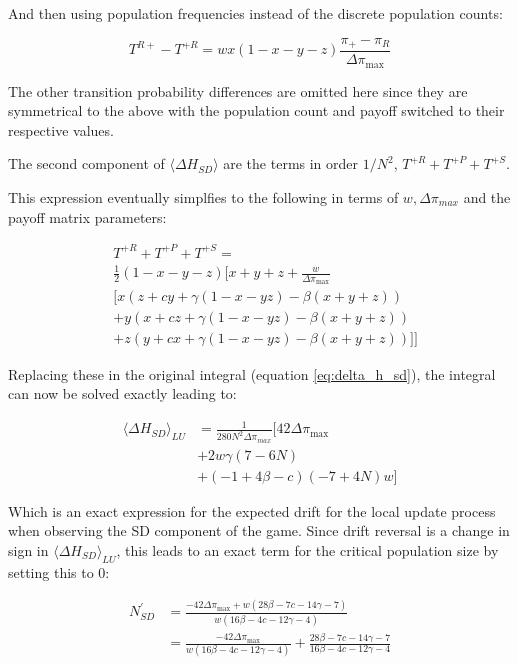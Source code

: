 \documentclass[%
 reprint,
 amsmath,amssymb,
 aps,
]{revtex4-2}
\begin{document}
And then using population frequencies instead of the discrete population counts:


\begin{equation}
T^{R+} - T^{+R} = wx(1-x-y-z)\frac{\pi_+ - \pi_R}{\Delta \pi_{\text{max}}}
\end{equation}

The other transition probability differences are omitted here since they are symmetrical to the above with the 
population count and payoff switched to their respective values.

The second component of $\langle \Delta H_{SD} \rangle$ are the terms in order $1/N^2$, $T^{+R} + T^{+P} + T^{+S}$.

This expression eventually simplfies to the following in terms of $w, \Delta \pi_{max}$ and the payoff
matrix parameters:

\begin{align}
&T^{+R} + T^{+P} + T^{+S} = \nonumber\\ 
&\frac{1}{2}(1-x-y-z)\Bigg[x + y + z + \frac{w}{\Delta \pi_{\text{max}}}  \nonumber\\
&\Big[x(z + cy + \gamma(1 - x - y z) - \beta(x+y+z))  \nonumber\\
&+ y(x + cz + \gamma(1 - x - y z) - \beta(x+y+z))  \nonumber\\
&+ z(y + cx + \gamma(1 - x - y z) - \beta(x+y+z))\Big]
\Bigg] \nonumber
\end{align}

Replacing these in the original integral (equation \ref{eq:delta_h_sd}), the integral can now be solved exactly
leading to:


\begin{align}
\langle \Delta H_{SD} \rangle_{LU} &= \frac{1}{280N^2 \Delta \pi_{max}} \Bigg[42 \Delta \pi_{\text{max}} \nonumber \\
&+ 2w \gamma (7 - 6N) \nonumber\\
&+ (-1+4\beta - c)(-7 + 4N)w \Bigg]
\end{align}



Which is an exact expression for the expected drift for the local update process when observing the SD
component of the game. Since drift reversal is a change in sign in $\langle \Delta H_{SD} \rangle_{LU}$, this 
leads to an exact term for the critical population size by setting this to 0:



\begin{align}
N^\prime_{SD} &= \frac{-42 \Delta \pi_{\text{max}} + w(28\beta - 7c  - 14 \gamma - 7)}{w(16 \beta - 4c -12\gamma - 4)} \nonumber\\
&= \frac{-42 \Delta \pi_{\text{max}}}{w(16 \beta - 4c -12\gamma - 4)}
+ \frac{28 \beta - 7c - 14\gamma - 7}{16 \beta - 4c -12\gamma - 4}
\end{align}
\end{document}
